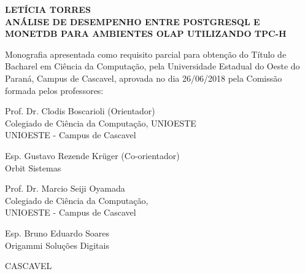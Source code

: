 

\fontsize{12}{12}
\begin{center}
\textbf{\MakeUppercase{Letícia Torres}}\\
\vspace{5cm}
\fontsize{14}{14}
\textbf{\MakeUppercase{Análise de Desempenho entre PostgreSQL e MonetDB para Ambientes OLAP Utilizando TPC-H}}\\
\vspace{3cm}
\end{center}
\fontsize{12}{12}


\begin{center}
\fontsize{10}{10}
Monografia apresentada como requisito parcial para obtenção do Título de Bacharel em Ciência da Computação, pela Universidade Estadual do Oeste do Paraná, Campus de Cascavel, aprovada no dia 26/06/2018 pela Comissão formada pelos professores:\\
\end{center}

\vspace{0.9cm}
\begin{center}
Prof. Dr. Clodis Boscarioli (Orientador)\\
Colegiado de Ciência da Computação, UNIOESTE\\ 
UNIOESTE - Campus de Cascavel\\
\vspace{0.5cm}

Esp. Gustavo Rezende Krüger (Co-orientador)\\
Orbit Sistemas\\
\vspace{0.5cm}

Prof. Dr. Marcio Seiji Oyamada\\
Colegiado de Ciência da Computação, \\ 
UNIOESTE - Campus de Cascavel\\
\vspace{0.5cm}

Esp. Bruno Eduardo Soares\\
Origammi Soluções Digitais\\
\end{center}

\vspace{2.5cm}
\begin{center}
CASCAVEL\\
\the\year
\end{center}
